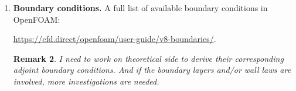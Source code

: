 \documentclass[onsided]{book}
\numberwithin{equation}{section}
\newtheorem{remark}{Remark}[section]
\begin{document}
\begin{enumerate}
     \url{https://cfd.direct/openfoam/user-guide/v8-turbulence/}.
     
     \begin{remark}
         At the moment, I only focus on $k$-$\epsilon$ and Smagorinsky turbulence models.
     \end{remark}
    \item \textbf{Boundary conditions.} A full list of available boundary conditions in OpenFOAM:
    
    \url{https://cfd.direct/openfoam/user-guide/v8-boundaries/}.
    
    \begin{remark}
        I need to work on theoretical side to derive their corresponding adjoint boundary conditions. And if the boundary layers and/or wall laws are involved, more investigations are needed.
    \end{remark}   
\end{enumerate}
\end{document}
